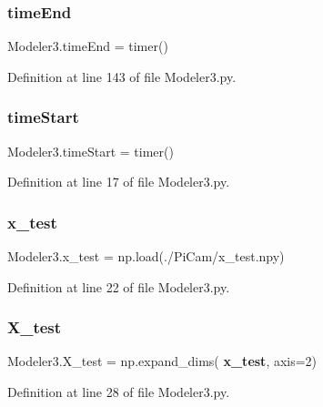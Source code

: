 \mbox{\label{namespace_modeler3_a7b16064f9c4a587f0f70e9693d3a6369}} 
\subsubsection{time\+End}
{\footnotesize\ttfamily Modeler3.\+time\+End = timer()}



Definition at line 143 of file Modeler3.\+py.

\mbox{\label{namespace_modeler3_a86af7af75254c8f61adb1ac689cd7560}} 
\subsubsection{time\+Start}
{\footnotesize\ttfamily Modeler3.\+time\+Start = timer()}



Definition at line 17 of file Modeler3.\+py.

\mbox{\label{namespace_modeler3_aaf93988a63a5d2b1c57821d78aec2482}} 
\subsubsection{x\+\_\+test}
{\footnotesize\ttfamily Modeler3.\+x\+\_\+test = np.\+load(\textquotesingle{}./Pi\+Cam/x\+\_\+test.\+npy\textquotesingle{})}



Definition at line 22 of file Modeler3.\+py.

\mbox{\label{namespace_modeler3_aae80c36a8712435d7adfd179f5959bcb}} 
\subsubsection{X\+\_\+test}
{\footnotesize\ttfamily Modeler3.\+X\+\_\+test = np.\+expand\+\_\+dims(\textbf{ x\+\_\+test}, axis=2)}



Definition at line 28 of file Modeler3.\+py.

\mbox{\label{namespace_modeler3_ab10b40f6427db380a7fb98ad6508005a}} 
